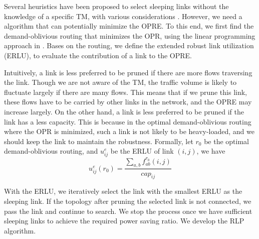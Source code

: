 \documentclass[conference]{IEEEtran}
\begin{document}
Several heuristics have been proposed to select sleeping links without the knowledge of a specific TM, with various considerations \cite{networking:car}\cite{networking:dmp}\cite{networking:grida}\cite{ESACON11InfocomWs}. However, we need a algorithm that can potentially minimize the OPRE. To this end, we first find the demand-oblivious routing that minimizes the OPR, using the linear programming approach in \cite{networking:oblivious}. Bases on the routing, we define the extended robust link utilization (ERLU), to evaluate the contribution of a link to the OPRE.

Intuitively, a link is less preferred to be pruned if there are more flows traversing the link. Though we are not aware of the TM, the traffic volume is likely to fluctuate largely if there are many flows. This means that if we prune this link, these flows have to be carried by other links in the network, and the OPRE may increase largely. On the other hand, a link is less preferred to be pruned if the link has a less capacity. This is because in the optimal demand-oblivious routing where the OPR is minimized, such a link is not likely to be heavy-loaded, and we should keep the link to maintain the robustness. Formally, let $r_0$ be the optimal demand-oblivious routing, and $u^e_{ij}$ be the ERLU of link $(i, j)$, we have
\begin{equation}
\label{equation_u_eijr}
	u^e_{ij}(r_0) = \frac {\sum_{a,b}f^{r_0}_{ab}(i,j)} {cap_{ij}}
\end{equation}

With the ERLU, we iteratively select the link with the smallest ERLU as the sleeping link. If the topology after pruning the selected link is not connected, we pass the link and continue to search. We stop the process once we have sufficient sleeping links to achieve the required power saving ratio. We develop the RLP algorithm.
\end{document}
